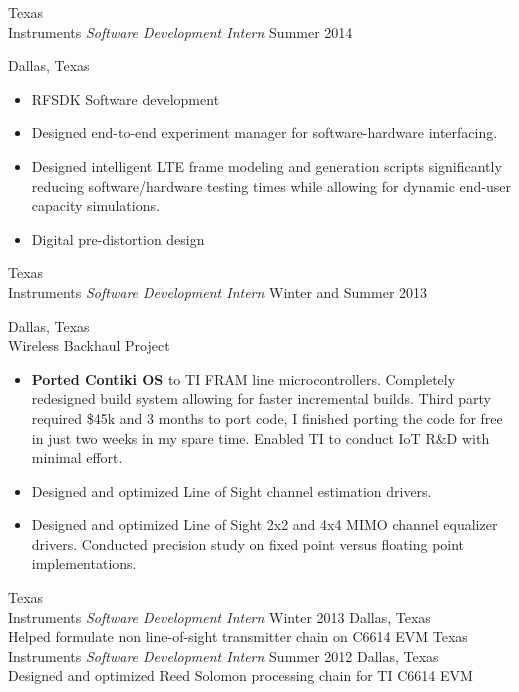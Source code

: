 \documentclass[]{friggeri-cv} %
\begin{document}
\begin{entrylist}
\entry
{Texas \\ Instruments}
{\emph{Software Development Intern}}
{Summer 2014}
{Dallas, Texas \\  
\begin{itemize}
\item RFSDK Software development
\item Designed end-to-end experiment manager for software-hardware interfacing.
\item Designed intelligent LTE frame modeling and generation scripts significantly reducing software/hardware testing times while allowing for dynamic end-user capacity simulations.
\item Digital pre-distortion design 
\end{itemize}}

\entry
{Texas \\ Instruments}
{\emph{Software Development Intern}}
{Winter and Summer 2013}
{Dallas, Texas \\ Wireless Backhaul Project
	\begin{itemize}
	\item \textbf{Ported Contiki OS} to TI FRAM line microcontrollers. Completely redesigned build system allowing for faster incremental builds. Third party required \$45k and 3 months to port code, I finished porting the code for free in just two weeks in my spare time. Enabled TI to conduct IoT R\&D with minimal effort.  
	\item Designed and optimized Line of Sight channel estimation drivers.
	\item Designed and optimized Line of Sight 2x2 and 4x4 MIMO channel equalizer drivers. Conducted precision study on fixed point versus floating point implementations.

\end{itemize}}


\entry
{Texas\\  Instruments}
{\emph{Software Development Intern}}
{Winter 2013}
{Dallas, Texas \\
Helped formulate non line-of-sight transmitter chain on C6614 EVM
}
\entry
{Texas \\ Instruments}
{\emph{Software Development Intern}}
{Summer 2012}
{Dallas, Texas \\
Designed and optimized Reed Solomon processing chain for TI C6614 EVM 
}


\end{entrylist}
\end{document}
